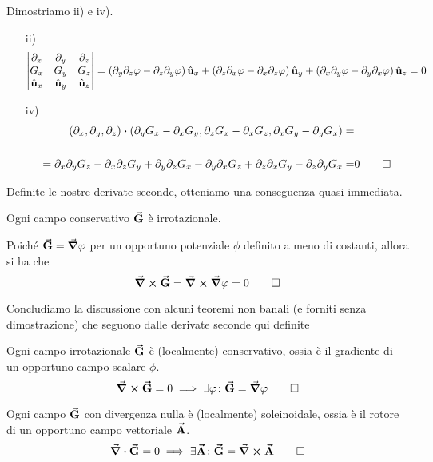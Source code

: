 \begin{demonstration}
	Dimostriamo ii) e iv).
	\begin{itemize}
		\item[ii)]
		\begin{equation*}
			\begin{vmatrix}
				\partial_x & \partial_y & \partial_z\\
				G_x & G_y & G_z\\
				\hat{\mathbf{u}}_x & \hat{\mathbf{u}}_y & \hat{\mathbf{u}}_z
			\end{vmatrix}=\left(\partial_y\partial_z\varphi-\partial_z\partial_y\varphi\right)\hat{\mathbf{u}}_x+\left(\partial_z\partial_x\varphi-\partial_x\partial_z\varphi\right)\hat{\mathbf{u}}_y+\left(\partial_x\partial_y\varphi-\partial_y\partial_x\varphi\right)\hat{\mathbf{u}}_z=0
		\end{equation*}
		\item[iv)]
		\begin{align*}
			\left(\partial_x,\partial_y,\partial_z\right)\vdot(\partial_yG_x-\partial_xG_y,\partial_zG_x-\partial_xG_z,\partial_xG_y-\partial_yG_x)=&\\
			\\=\partial_x\partial_yG_z-\partial_x\partial_zG_y+\partial_y\partial_zG_x-\partial_y\partial_xG_z+\partial_z\partial_xG_y-\partial_z\partial_yG_x=&0\qedhere
		\end{align*}
	\end{itemize}
\end{demonstration}
Definite le nostre derivate seconde, otteniamo una conseguenza quasi immediata.
\begin{proposition}
	Ogni campo conservativo $\vb*{\va{G}}$ è irrotazionale.
\end{proposition}
\begin{demonstration}
	Poiché $\vb*{\va{G}}=\grad{\varphi}$ per un opportuno potenziale $\phi$ definito a meno di costanti, allora si ha che
	\begin{equation*}
		\curl{\vb*{\va{G}}}=\curl{\grad{\varphi}}=0\qedhere
	\end{equation*}
\end{demonstration}
Concludiamo la discussione con alcuni teoremi non banali (e forniti senza dimostrazione) che seguono dalle derivate seconde qui definite
\begin{theoremaqed}
	Ogni campo irrotazionale $\vb*{\va{G}}$ è (localmente) conservativo, ossia è il gradiente di un opportuno campo scalare $\phi$.
	\begin{equation*}
		\curl{\vb*{\va{G}}}=0\implies \exists \varphi\colon \vb*{\va{G}}=\grad{\varphi}\qedhere
	\end{equation*}
\end{theoremaqed}
\begin{theoremaqed}
	Ogni campo $\vb*{\va{G}}$ con divergenza nulla è (localmente) soleinoidale, ossia è il rotore di un opportuno campo vettoriale $\vb*{\va{A}}$.
	\begin{equation*}
		\div{\vb*{\va{G}}}=0\implies \exists \vb*{\va{A}}\colon \vb*{\va{G}}=\curl{\vb*{\va{A}}}\qedhere
	\end{equation*}
\end{theoremaqed}
